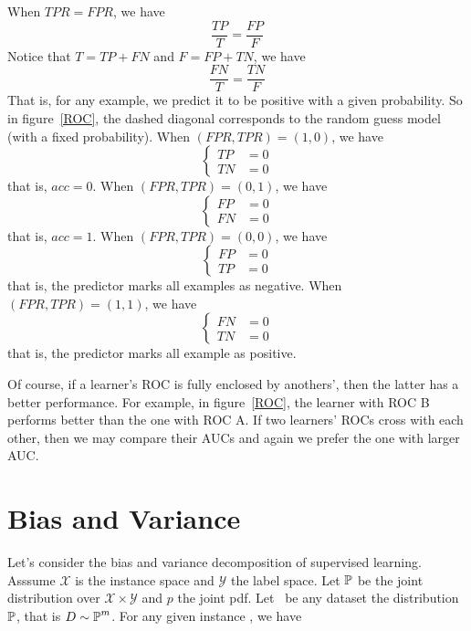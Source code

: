 When $TPR = FPR$, we have
$$\frac{TP}{T} = \frac{FP}{F}$$
Notice that $T = TP + FN$ and $F = FP + TN$, we have
$$\frac{FN}{T} = \frac{TN}{F}$$
That is, for any example, we predict it to be positive with a given probability. So in figure~\ref{ROC}, the
dashed diagonal corresponds to the random guess model (with a fixed probability). When $(FPR, TPR) = (1, 0)$,
we have
\begin{equation*}
    \begin{cases}
        TP &= 0\\
        TN &= 0
    \end{cases}
\end{equation*}
that is, $acc = 0$. When $(FPR, TPR) = (0, 1)$, we have
\begin{equation*}
    \begin{cases}
        FP &= 0\\
        FN &= 0
    \end{cases}
\end{equation*}
that is, $acc = 1$. When $(FPR, TPR) = (0, 0)$, we have
\begin{equation*}
    \begin{cases}
        FP &= 0\\
        TP &= 0
    \end{cases}
\end{equation*}
that is, the predictor marks all examples as negative. When $(FPR, TPR) = (1, 1)$, we have
\begin{equation*}
    \begin{cases}
        FN &= 0\\
        TN &= 0
    \end{cases}
\end{equation*}
that is, the predictor marks all example as positive.

Of course, if a learner's ROC is fully enclosed by anothers', then the latter has a better performance.
For example, in figure~\ref{ROC}, the learner with ROC B performs better than the one with ROC A.
If two learners' ROCs cross with each other, then we may compare their AUCs and again we prefer the one with
larger AUC\@.

\section{Bias and Variance}

Let's consider the bias and variance decomposition of supervised learning. Asssume $\mathcal{X}$ is the
instance space and $\mathcal{Y}$ the label space. Let $\operatorname*{\mathbb{P}}$ be the joint distribution over
$\mathcal{X} \times \mathcal{Y}$ and $p$ the joint pdf. Let \dataset\ be any \iid dataset \wrt the
distribution $\operatorname*{\mathbb{P}}$, that is $D \sim \operatorname*{\mathbb{P}}^m$. For any given instance , we have


